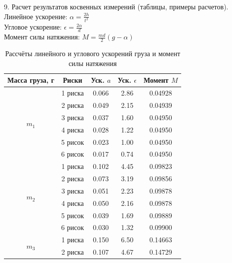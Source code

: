 \documentclass[12pt]{article}
\begin{document}
\newpage


\begin{flushleft}
    9. Расчет результатов косвенных измерений (таблицы, примеры расчетов). \\
    Линейное ускорение: $ \alpha = \frac{2h}{t^2} $ \\
    Угловое ускорение: $ \epsilon = \frac{2\alpha}{d} $ \\
    Момент силы натяжения: $ M = \frac{md}{2}(g - \alpha) $ \\
\end{flushleft}

\begin{table}[h]
    \centering
    \renewcommand{\arraystretch}{1.3}
    \setlength{\tabcolsep}{8pt}
    \captionsetup{justification=centering, font=bf}
    \caption{Рассчёты линейного и углового ускорений груза и момент силы натяжения}
    \begin{tabular}{|c|c|c|c|c|}
        \hline
        Масса груза, г & Риски & Уск. $ a $ & Уск. $ \epsilon $ & Момент $ M $ \\
        \hline
        \multirow{6}{*}{$m_1$} & 1 риска & 0.066 & 2.86 & 0.04928 \\
        \cline{2-5}
        & 2 риска & 0.049 & 2.15 & 0.04939 \\
        \cline{2-5}
        & 3 риска & 0.037 & 1.60 & 0.04950 \\
        \cline{2-5}
        & 4 риска & 0.028 & 1.22 & 0.04950 \\
        \cline{2-5}
        & 5 рисок & 0.023 & 1.00 & 0.04950 \\
        \cline{2-5}
        & 6 рисок & 0.017 & 0.74 & 0.04950 \\
        \hline
        \multirow{6}{*}{$m_2$} & 1 риска & 0.102 & 4.45 & 0.09823 \\
        \cline{2-5}
        & 2 риска & 0.073 & 3.19 & 0.09856 \\
        \cline{2-5}
        & 3 риска & 0.051 & 2.23 & 0.09878 \\
        \cline{2-5}
        & 4 риска & 0.050 & 2.16 & 0.09878 \\
        \cline{2-5}
        & 5 рисок & 0.039 & 1.69 & 0.09889 \\
        \cline{2-5}
        & 6 рисок & 0.030 & 1.32 & 0.09900 \\
        \hline
        \multirow{6}{*}{$m_3$} & 1 риска & 0.150 & 6.50 & 0.14663 \\
        \cline{2-5}
        & 2 риска & 0.107 & 4.67 & 0.14729 \\

\end{tabular}
\end{table}
\end{document}
